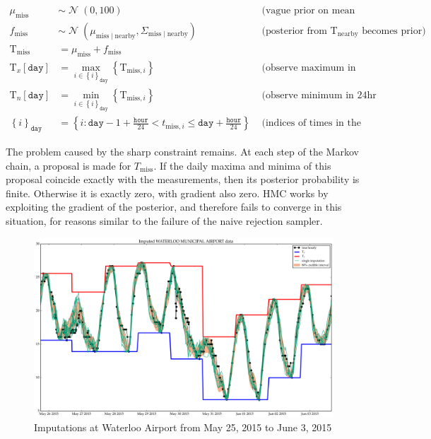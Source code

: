 \documentclass[letter]{article}
\makeatletter
\def\maxwidth{\ifdim\Gin@nat@width>\linewidth\linewidth
\else\Gin@nat@width\fi}
\let\Oldincludegraphics\includegraphics
\renewcommand{\includegraphics}[1]{\Oldincludegraphics[width=.8\maxwidth]{#1}}
\def\lt{<}
\newcommand{\genericdel}[3]{%
      \left#1#3\right#2
    }
\newcommand{\del}[1]{\genericdel(){#1}}
\newcommand{\sbr}[1]{\genericdel[]{#1}}
\newcommand{\cbr}[1]{\genericdel\{\}{#1}}
\DeclareMathOperator{\normal}{\mathcal{N}}
\newcommand{\T}{\mathrm{T}}
\newcommand{\Tn}{\T_{n}}
\newcommand{\Tx}{\T_{x}}
\newcommand{\miss}{\mathrm{miss}}
\newcommand{\obs}{\mathrm{nearby}}
\newcommand{\hour}{\mathtt{hour}}
\newcommand{\iday}{\mathtt{day}}
\newcommand{\dayset}[1]{\cbr{i}_{#1}}
\makeatother
\begin{document}
\begin{equation}
\label{eq:idealmodel}
\begin{aligned}
    \mu_\miss &\sim \normal\del{0,100} & \text{ (vague prior on mean temperature)} \\
    f_\miss &\sim \normal\del{\mu_{\miss \mid \obs}, \Sigma_{\miss \mid \obs}} & \text{ (posterior from $\T_\obs$ becomes prior)} \\
    \T_\miss &= \mu_\miss + f_\miss \\
    \Tx\sbr{\iday} &= \max_{i \in \dayset{\iday}}\cbr{ \T_{\miss,i}} & \text{ (observe maximum in 24hr window)}\\
    \Tn\sbr{\iday} &= \min_{i \in \dayset{\iday}}\cbr{ \T_{\miss,i}} & \text{ (observe minimum in 24hr window)}\\
    \dayset{\iday} &= \cbr{i : \iday-1+\frac{\hour}{24} \lt t_{\miss,i} \le \iday + \frac{\hour}{24}} & \text{ (indices of times in the 24hr window)}
\end{aligned}
\end{equation}
    


    	The problem caused by the sharp constraint remains. At each step of the
Markov chain, a proposal is made for \(T_\miss\). If the daily maxima
and minima of this proposal coincide exactly with the measurements, then
its posterior probability is finite. Otherwise it is exactly zero, with
gradient also zero. HMC works by exploiting the gradient of the
posterior, and therefore fails to converge in this situation, for
reasons similar to the failure of the naive rejection sampler.

\begin{figure}
\centering
\includegraphics{figures/imputations_SEonly.png}
\caption{Imputations at Waterloo Airport from May 25, 2015 to June 3,
2015}
\end{figure}
\end{document}
